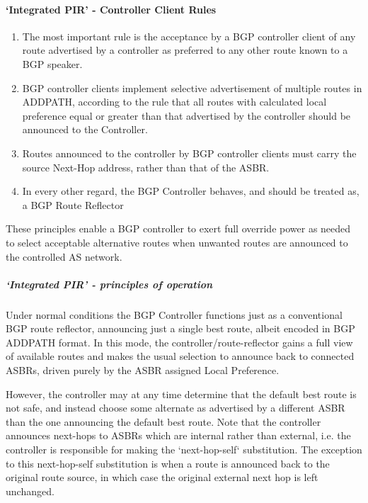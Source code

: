 \paragraph{`Integrated PIR' - Controller Client Rules}
\begin{enumerate}
    \item The most important rule is the acceptance by a BGP controller client of any route advertised by a controller as preferred to any other route known to a BGP speaker.
    
    \item BGP controller clients implement selective advertisement of multiple routes in ADDPATH, according to the rule that all routes with calculated local preference equal or greater than that advertised by the controller should be announced to the Controller.
    
    \item Routes announced to the controller by BGP controller clients must carry the source Next-Hop address, rather than that of the ASBR.
     
    \item In every other regard, the BGP Controller behaves, and should be treated as, a BGP Route Reflector
     
\end{enumerate}


 These principles enable a BGP controller to exert full override power as needed to select acceptable alternative routes when unwanted routes are announced to the controlled AS network.

 \subparagraph{`Integrated PIR' - principles of operation}
 Under normal conditions the BGP Controller functions just as a conventional BGP route reflector, announcing just a single best route, albeit encoded in BGP ADDPATH format.  In this mode, the controller/route-reflector gains a full view of available routes and makes the usual selection to announce back to connected ASBRs, driven purely by the ASBR assigned Local Preference.

 However, the controller may at any time determine that the default best route is not safe, and instead choose some alternate as advertised by a different ASBR than the one announcing the default best route.  Note that the controller announces next-hops to ASBRs which are internal rather than external, i.e. the controller is responsible for making the `next-hop-self` substitution.  The exception to this next-hop-self substitution is when a route is announced back to the original route source, in which case the original external next hop is left unchanged.

